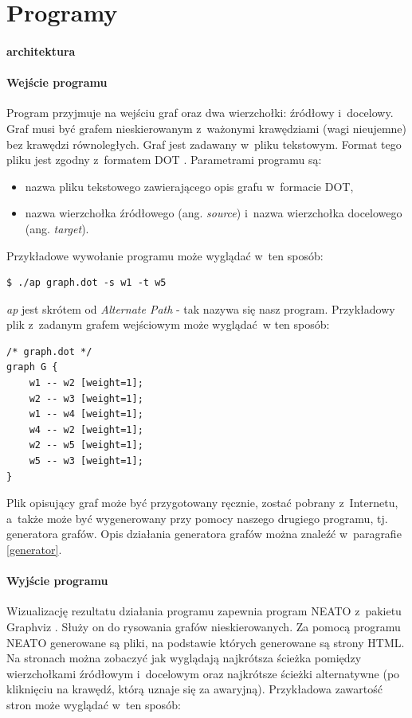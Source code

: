 \documentclass[a4paper, 12pt]{article}
\begin{document}
\section{Programy}

\paragraph{architektura}

\paragraph{Wejście programu}
Program przyjmuje na wejściu graf oraz dwa wierzchołki: źródłowy i~docelowy. Graf musi być grafem nieskierowanym z~ważonymi krawędziami (wagi nieujemne) bez krawędzi równoległych. Graf jest zadawany w~pliku tekstowym. Format tego pliku jest zgodny z~formatem DOT \cite{dot}. Parametrami programu są:

\begin{itemize}
\item nazwa pliku tekstowego zawierającego opis grafu w~formacie DOT,
\item nazwa wierzchołka źródłowego (ang. {\it source}) i~nazwa wierzchołka docelowego (ang. {\it target}).
\end{itemize}

Przykładowe wywołanie programu może wyglądać w~ten sposób:

\begin{verbatim}
$ ./ap graph.dot -s w1 -t w5
\end{verbatim}

{\it ap} jest skrótem od {\it Alternate Path} - tak nazywa się nasz program. Przykładowy plik z~zadanym grafem wejściowym może wyglądać~w ten sposób:

\begin{verbatim}
/* graph.dot */
graph G {
	w1 -- w2 [weight=1];
	w2 -- w3 [weight=1];
	w1 -- w4 [weight=1];
	w4 -- w2 [weight=1];
	w2 -- w5 [weight=1];
	w5 -- w3 [weight=1];
}
\end{verbatim}

Plik opisujący graf może być przygotowany ręcznie, zostać pobrany z~Internetu, a~także może być wygenerowany przy pomocy naszego drugiego programu, tj. generatora grafów. Opis działania generatora grafów można znaleźć w~paragrafie \ref{generator}.

\paragraph{Wyjście programu}
Wizualizację rezultatu działania programu zapewnia program NEATO z~pakietu Graphviz \cite{gv}. Służy on do rysowania grafów nieskierowanych. Za pomocą programu NEATO generowane są pliki, na podstawie których generowane są strony HTML. Na stronach można zobaczyć jak wyglądają najkrótsza ścieżka pomiędzy wierzchołkami źródłowym i~docelowym oraz najkrótsze ścieżki alternatywne (po kliknięciu na krawędź, którą uznaje się za awaryjną). Przykładowa zawartość stron może wyglądać w~ten sposób:
\end{document}
